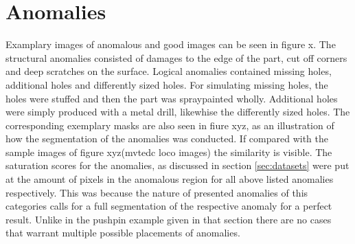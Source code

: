 \section{Anomalies}
\label{sec:flatconnectoranomalies}

Examplary images of anomalous and good images can be seen in figure x. The structural anomalies consisted of damages to the edge of the part, cut off corners and deep scratches on the surface. 
Logical anomalies contained missing holes, additional holes and differently sized holes. For simulating missing holes, the holes were stuffed and then the part was spraypainted wholly. 
Additional holes were simply produced with a metal drill, likewhise the differently sized holes. 
The corresponding exemplary masks are also seen in fiure xyz, as an illustration of how the segmentation of the anomalies was conducted. If compared with the sample images of figure xyz(mvtedc loco images) 
the similarity is visible. The saturation scores for the anomalies, as discussed in section \ref{sec:datasets} were put at the amount of pixels in the anomalous region for all above listed anomalies respectively.
This was because the nature of presented anomalies of this categories calls for a full segmentation of the respective anomaly for a perfect result. Unlike in the pushpin example given in that section 
there are no cases that warrant multiple possible placements of anomalies.





